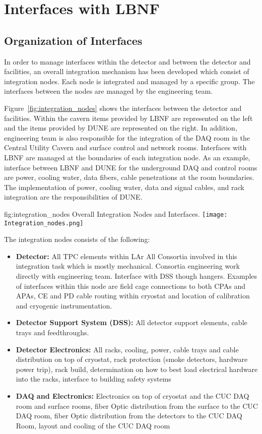 \chapter{Interfaces with LBNF}
\label{vl:tc-lbnf}

\section{Organization of Interfaces}
\label{sec:inter-org-interf}
In order to manage interfaces within the detector and between the
detector and facilities, an overall integration mechanism has been
developed which consist of integration nodes. Each node is integrated
and managed by a specific group. The interfaces between the nodes are
managed by the  engineering team.

Figure~\ref{fig:integration_nodes} shows the interfaces between the
detector and facilities. Within the cavern items provided by LBNF are
represented on the left and the items provided by DUNE are represented
on the right. In addition,  engineering team is also
responsible for the integration of the DAQ room in the Central Utility
Cavern and surface control and network rooms. Interfaces with LBNF are
managed at the boundaries of each integration node. As an example,
interface between LBNF and DUNE for the underground DAQ and control
rooms are power, cooling water, data fibers, cable penetrations at the
room boundaries. The implementation of power, cooling water, data and
signal cables, and rack integration are the responsibilities of DUNE.
\begin{dunefigure}{fig:integration_nodes}
  {Overall Integration Nodes and Interfaces.}
  \texttt{[image: Integration\_nodes.png]}
\end{dunefigure}


The integration nodes consists of the following:
\begin{itemize}
\item {\bf Detector:} All TPC elements within LAr All Consortia involved in
  this integration task which is mostly mechanical. Consortia
  engineering work directly with  engineering team.
  Interface with DSS though hangers. Examples of interfaces within
  this node are field cage connections to both CPAs and APAs, CE and
  PD cable routing within cryostat and location of calibration and
  cryogenic instrumentation.
\item {\bf Detector Support System (DSS):} All detector support elements,
  cable trays and feedthroughs.
\item {\bf Detector Electronics:} All racks, cooling, power, cable
  trays and cable distribution on top of cryostat, rack protection
  (smoke detectors, hardware power trip), rack build, determination on
  how to best load electrical hardware into the racks, interface to
  building safety systems
\item {\bf DAQ and Electronics:} Electronics on top of cryostat and
  the CUC DAQ room and surface rooms, fiber Optic distribution from
  the surface to the CUC DAQ room, fiber Optic distribution from the
  detectors to the CUC DAQ Room, layout and cooling of the CUC DAQ
  room
\end{itemize}

